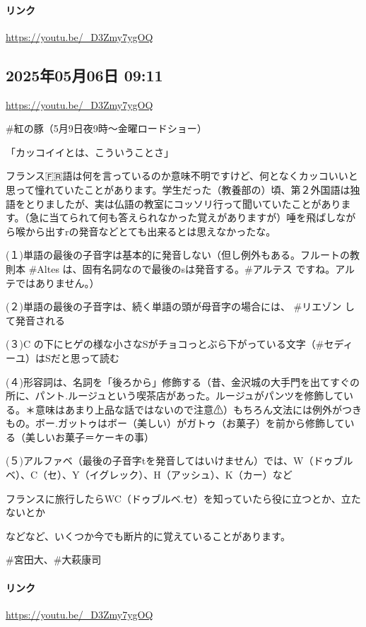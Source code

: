 \paragraph{リンク}
\url{https://youtu.be/_D3Zmy7ygOQ}

\subsection*{2025年05月06日 09:11}

\url{https://youtu.be/_D3Zmy7ygOQ}

\#紅の豚（5月9日夜9時〜金曜ロードショー）

「カッコイイとは、こういうことさ」

フランス🇫🇷語は何を言っているのか意味不明ですけど、何となくカッコいいと思って憧れていたことがあります。学生だった（教養部の）頃、第２外国語は独語をとりましたが、実は仏語の教室にコッソリ行って聞いていたことがあります。（急に当てられて何も答えられなかった覚えがありますが）唾を飛ばしながら喉から出すrの発音などとても出来るとは思えなかったな。

(１)単語の最後の子音字は基本的に発音しない（但し例外もある。フルートの教則本 \#Altes は、固有名詞なので最後のsは発音する。\#アルテス ですね。アルテではありません。）

(２)単語の最後の子音字は、続く単語の頭が母音字の場合には、 \#リエゾン して発音される

(３)C の下にヒゲの様な小さなSがチョコっとぶら下がっている文字（\#セディーユ）はSだと思って読む

(４)形容詞は、名詞を「後ろから」修飾する（昔、金沢城の大手門を出てすぐの所に、パント.ルージュという喫茶店があった。ルージュがパンツを修飾している。＊意味はあまり上品な話ではないので注意⚠）もちろん文法には例外がつきもの。ボー.ガットゥはボー（美しい）がガトゥ（お菓子）を前から修飾している（美しいお菓子＝ケーキの事）

(５)アルファベ（最後の子音字tを発音してはいけません）では、W（ドゥブルベ）、C（セ）、Y（イグレック）、H（アッシュ）、K（カー）など

フランスに旅行したらWC（ドゥブルベ.セ）を知っていたら役に立つとか、立たないとか

などなど、いくつか今でも断片的に覚えていることがあります。

\#宮田大、\#大萩康司

\paragraph{リンク}
\url{https://youtu.be/_D3Zmy7ygOQ}

